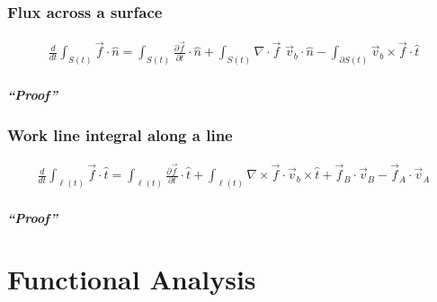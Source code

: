 \documentclass[letterpaper,10pt,english]{jupyterBook}
\begin{document}
\section{Flux across a surface}
\label{\detokenize{ch/tensor-algebra-calculus/time-derivative-of-integrals:flux-across-a-surface}}\label{\detokenize{ch/tensor-algebra-calculus/time-derivative-of-integrals:tensor-calculus-time-derivative-of-integrals-flux}}\begin{equation*}
\begin{split}\frac{d}{dt} \int_{S(t)} \vec{f} \cdot \hat{n} = \int_{S(t)} \frac{\partial \vec{f}}{\partial t} \cdot \hat{n} + \int_{S(t)} \nabla \cdot \vec{f} \,\, \vec{v}_b \cdot \hat{n} - \int_{\partial S(t)} \vec{v}_b \times \vec{f} \cdot \hat{t} \end{split}
\end{equation*}\subsubsection*{“Proof”}


\section{Work line integral along a line}
\label{\detokenize{ch/tensor-algebra-calculus/time-derivative-of-integrals:work-line-integral-along-a-line}}\label{\detokenize{ch/tensor-algebra-calculus/time-derivative-of-integrals:tensor-calculus-time-derivative-of-integrals-work}}\begin{equation*}
\begin{split}\frac{d}{dt} \int_{\ell(t)} \vec{f} \cdot \hat{t} =  \int_{\ell(t)} \frac{\partial \vec{f}}{\partial t} \cdot \hat{t} + \int_{\ell(t)} \nabla \times \vec{f} \cdot \vec{v}_b \times \hat{t} + \vec{f}_B \cdot \vec{v}_B - \vec{f}_A \cdot \vec{v}_A \end{split}
\end{equation*}\subsubsection*{“Proof”}

\sphinxstepscope


\part{Functional Analysis}

\sphinxstepscope
\end{document}
